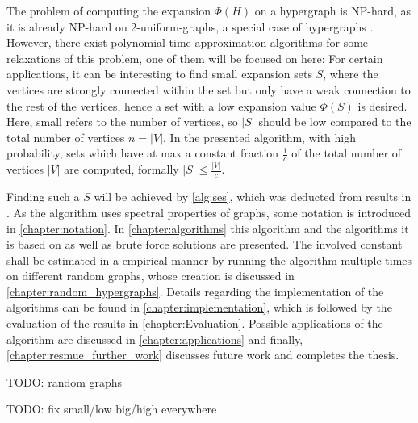 The problem of computing the expansion $\Phi(H)$ on a hypergraph is NP-hard, as it is already NP-hard on 2-uniform-graphs, a special case of hypergraphs \cite{kaibel2004expansion}.
However, there exist polynomial time approximation algorithms for some relaxations of this problem, one of them will be focused on here:
For certain applications, it can be interesting to find small expansion sets $S$, where the vertices are strongly connected within the set but only have a weak connection to the rest of the vertices, hence a set with a low expansion value $\Phi(S)$ is desired. Here, small refers to the number of vertices, so $|S|$ should be low compared to the total number of vertices $n = |V|$. In the presented algorithm, with high probability, sets which have at max a constant fraction $\frac{1}{c}$ of the total number of vertices $|V|$ are computed, formally $|S|\le \frac{|V|}{c}$.

Finding such a $S$ will be achieved by \cref{alg:ses}, which was deducted from results in \cite{ChanLTZ16}. As the algorithm uses spectral properties of graphs, some notation is introduced in \cref{chapter:notation}. In \cref{chapter:algorithms} this algorithm and the algorithms it is based on as well as brute force solutions are presented.
The involved constant shall be estimated in a empirical manner by running the algorithm multiple times on different random graphs, whose creation is discussed in \cref{chapter:random_hypergraphs}.  Details regarding the implementation of the algorithms can be found in \cref{chapter:implementation}, which is followed by the evaluation of the results in \cref{chapter:Evaluation}. Possible applications of the algorithm are discussed in \cref{chapter:applications} and finally, \cref{chapter:resmue_further_work} discusses future work and completes the thesis.




TODO: random graphs

TODO: fix small/low big/high everywhere



